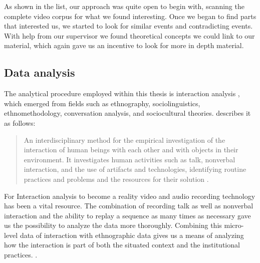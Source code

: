 As shown in the list, our approach was quite open to begin with, scanning the complete video corpus for what we found interesting. Once we began to find parts that interested us, we started to look for similar events and contradicting events. With help from our supervisor we found theoretical concepts we could link to our material, which again gave us an incentive to look for more in depth material.

\subsection{Data analysis}
The analytical procedure employed within this thesis is interaction analysis \citep{jordan1995interaction}, which emerged from fields such as ethnography, sociolinguistics, ethnomethodology, conversation analysis, and sociocultural theories. \citeauthor{jordan1995interaction} describes it as follows:

\begin{quote}
An interdisciplinary method for the empirical investigation of the interaction of human
beings with each other and with objects in their environment. It investigates human
activities such as talk, nonverbal interaction, and the use of artifacts and technologies,
identifying routine practices and problems and the resources for their solution \citep[p39]{jordan1995interaction}.
\end{quote}

For Interaction analysis to become a reality video and audio recording technology has been a vital resource. The combination of recording talk as well as nonverbal interaction and the ability to replay a sequence as many times as necessary gave us the possibility to analyze the data more thoroughly. Combining this micro-level data of interaction with ethnographic data gives us a means of analyzing how the interaction is part of both the situated context and the institutional practices. \citep{furberg2009scientific}. 



